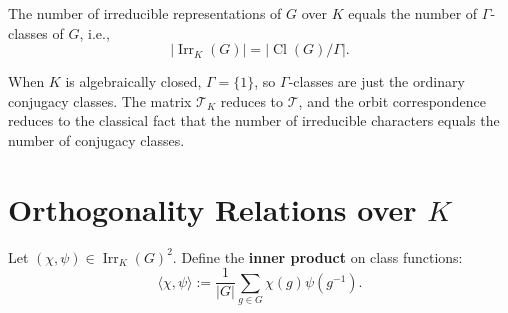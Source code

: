 \begin{cor}
\label{cor:orbit_count over K}
The number of irreducible representations of \(G\) over \(K\) equals the number of \(\Gamma\)-classes of \(G\), i.e.,
\[
|\operatorname{Irr}_K(G)| = |\operatorname{Cl}(G)/\Gamma|.
\]
\end{cor}

\begin{remark}
When \(K\) is algebraically closed, \(\Gamma = \{1\}\), so \(\Gamma\)-classes are just the ordinary conjugacy classes. The matrix \(\mathcal T_K\) reduces to $\mathcal T$, and the orbit correspondence reduces to the classical fact that the number of irreducible characters equals the number of conjugacy classes.
\end{remark}



\section{Orthogonality Relations over \(K\)}

\begin{defn}
Let \((\chi, \psi)\in \operatorname{Irr}_{K}(G)^2\). Define the \textbf{inner product} on class functions:
\[
\langle \chi, \psi \rangle := \frac{1}{|G|} \sum_{g \in G} \chi(g) \psi(g^{-1}).
\]
\end{defn}

